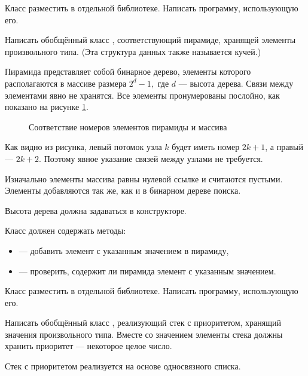 Класс разместить в отдельной библиотеке. Написать программу,
использующую его.

\task Написать обобщённый класс , соответствующий пирамиде,
хранящей элементы произвольного типа. (Эта структура данных также
называется кучей.)

Пирамида представляет собой бинарное дерево, элементы которого
располагаются в массиве размера $2^d-1,$ где $d$ — высота
дерева. Связи между элементами явно не хранятся. Все элементы
пронумерованы послойно, как показано на рисунке \ref{fig:heap}.

\begin{figure}
  \centering

  \caption{Соответствие номеров элементов пирамиды и массива\label{fig:heap}}
\end{figure}

Как видно из рисунка, левый потомок узла $k$ будет иметь номер $2k+1$,
а правый — $2k+2.$ Поэтому явное указание связей между узлами не требуется.

Изначально элементы массива равны нулевой ссылке и считаются
пустыми. Элементы добавляются так же, как и в бинарном дереве поиска.

Высота дерева должна задаваться в конструкторе.

Класс должен содержать методы:
\begin{itemize}
\item {} — добавить элемент с указанным значением в пирамиду,
\item {} — проверить, содержит ли пирамида элемент с указанным
  значением.
\end{itemize}

Класс разместить в отдельной библиотеке. Написать программу,
использующую его.

\task Написать обобщённый класс , реализующий стек
с приоритетом, хранящий значения
произвольного типа. Вместе со значением элементы стека должны хранить
приоритет — некоторое целое число.

Стек с приоритетом реализуется на основе односвязного списка. 

